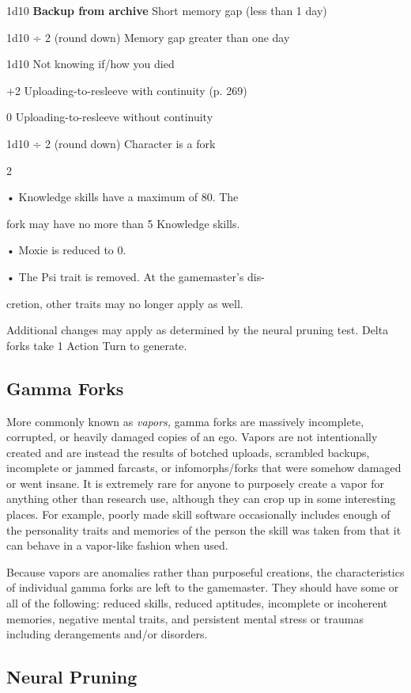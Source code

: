 1d10
\textbf{Backup from archive}
Short memory gap (less than 1 day)

1d10 ÷ 2 (round down)
Memory gap greater than one day

1d10
Not knowing if/how you died

+2
Uploading-to-resleeve with continuity (p. 269)

0
Uploading-to-resleeve without continuity

1d10 ÷ 2 (round down)
Character is a fork

2

•  Knowledge skills have a maximum of 80. The 

fork may have no more than 5 Knowledge skills.

•  Moxie is reduced to 0.

•  The Psi trait is removed. At the gamemaster's dis-

cretion, other traits may no longer apply as well.

Additional changes may apply as determined by the 
neural pruning test. Delta forks take 1 Action Turn 
to generate.

\subsection{Gamma Forks}

More commonly known as \textit{vapors,} gamma forks are 
massively incomplete, corrupted, or heavily damaged 
copies of an ego. Vapors are not intentionally created
and are instead the results of botched uploads,
scrambled backups, incomplete or jammed farcasts, 
or infomorphs/forks that were somehow damaged or 
went insane. It is extremely rare for anyone to purposely
create a vapor for anything other than research
use, although they can crop up in some interesting 
places. For example, poorly made skill software occasionally
includes enough of the personality traits and
memories of the person the skill was taken from that 
it can behave in a vapor-like fashion when used.

Because vapors are anomalies rather than purposeful
creations, the characteristics of individual gamma
forks are left to the gamemaster. They should have 
some or all of the following: reduced skills, reduced 
aptitudes, incomplete or incoherent memories, negative
mental traits, and persistent mental stress or traumas
including derangements and/or disorders.

\subsection{Neural Pruning}

